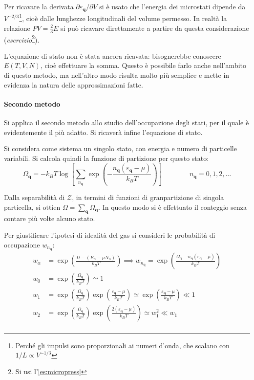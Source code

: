 Per ricavare la derivata $\partial \varepsilon_{\textbf{q}} / \partial V$ si è usato che l'energia dei microstati dipende da $V^{-2/3}$\footnote{Perché gli impulsi sono proporzionali ai numeri d'onda, che scalano con $1/L \propto V^{-1/3}$}, cioè dalle lunghezze longitudinali del volume permesso. In realtà la relazione $PV = \frac{2}{3} E$ si può ricavare direttamente a partire da questa considerazione (\textit{esercizio}\footnote{Si usi l'\cref{es:micropress}}).

L'equazione di stato non è stata ancora ricavata: bisognerebbe conoscere $E(T,V,N)$, cioè effettuare la somma. Questo è possibile farlo anche nell'ambito di questo metodo, ma nell'altro modo risulta molto più semplice e mette in evidenza la natura delle approssimazioni fatte.

\paragraph{Secondo metodo} Si applica il secondo metodo allo studio dell'occupazione degli stati, per il quale è evidentemente il più adatto. Si ricaverà infine l'equazione di stato.

Si considera come sistema un singolo stato, con energia e numero di particelle variabili. Si calcola quindi la funzione di partizione per questo stato:
\begin{equation*}
\Omega_{\textbf{q}} = - k_B T \log\left[\sum_{n_{\textbf{q}}} \exp \left( - \frac{n_{\textbf{q}}{(\varepsilon_{\textbf{q}} - \mu)}}{k_B T}\right)\right] \qquad \qquad n_{\textbf{q}} = 0, 1, 2, \dots
\end{equation*}

Dalla separabilità di $\mathcal{Z}$, in termini di funzioni di granpartizione di singola particella, si ottien $\Omega = \sum_{\textbf{q}} \Omega_{\textbf{q}}$. In questo modo si è effettuato il conteggio senza contare più volte alcuno stato.

Per giustificare l'ipotesi di idealità del gas si consideri le probabilità di occupazione $w_{n_{\textbf{q}}}$:
\begin{align*}
w_\alpha &= \exp \left(\frac{\Omega - (E_\alpha - \mu N_\alpha)}{k_B T}\right) \implies w_{n_{\textbf{q}}} = \exp \left(\frac{\Omega_{\textbf{q}} - n_{\textbf{q}}{ (\varepsilon_{\textbf{q}} - \mu)}}{k_B T}\right)\\
w_0 &= \exp \left(\frac{\Omega_{\textbf{q}}}{k_B T}\right) \simeq 1\\
w_1 &= \exp \left(\frac{\Omega_{\textbf{q}}}{k_B T}\right) \exp \left(\frac{\varepsilon_{\textbf{q}} - \mu}{k_B T}\right)  \simeq \exp \left(\frac{\varepsilon_{\textbf{q}} - \mu}{k_B T}\right) \ll 1\\
w_2 &= \exp \left(\frac{\Omega_{\textbf{q}}}{k_B T}\right) \exp \left(\frac{2(\varepsilon_{\textbf{q}} - \mu)}{k_B T}\right)  \simeq w_1^2 \ll w_1\\ 
\end{align*}

